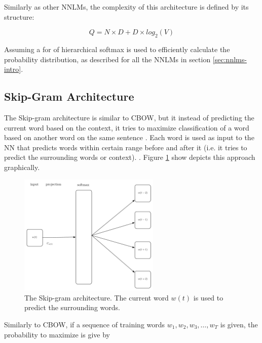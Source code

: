 Similarly as other \ac{NNLM}s, the complexity of this architecture
is defined by its structure:

\begin{equation}
  Q = N \times D + D \times  log_2(V)
\end{equation}

Assuming a for of hierarchical softmax is used to efficiently calculate the
probability distribution, as described for all the \ac{NNLM}s in section \ref{sec:nnlms-intro}.


\subsection{Skip-Gram Architecture}
\label{sec:skip-gram-architecture}

The Skip-gram architecture is similar to \ac{CBOW}, but it instead of
predicting the current word based on the context, it tries to maximize
classification of a  word based on another word on the same sentence
\cite{DBLP:journals/corr/abs-1301-3781}.  Each  word is used as input
to the \ac{NN} that  predicts words within certain range before and after 
it (i.e. it tries to predict the surrounding words or context). 
\cite{DBLP:journals/corr/abs-1301-3781}. Figure
\ref{fig:skipgram-architecture-alone} show depicts this approach graphically.


\begin{figure}[hptb!]
    \centering
    \includegraphics[width=0.6\textwidth]{images/word2vec-skipgram-latex.pdf} 
    \caption{The Skip-gram architecture. The current word $w(t)$ is used to
      predict the  surrounding words.}
    \label{fig:skipgram-architecture-alone}
\end{figure}



Similarly to  \ac{CBOW}, if a sequence of training words $w_1,w_2,w_3,
\dots, w_T$ is given, the probability to maximize is give by

